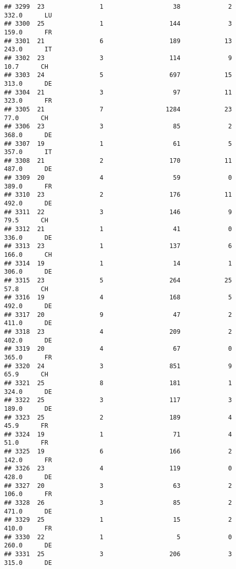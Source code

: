 \documentclass[
]{article}
\begin{document}
\begin{verbatim}
## 3299  23               1                   38             2    332.0      LU
## 3300  25               1                  144             3    159.0      FR
## 3301  21               6                  189            13    243.0      IT
## 3302  23               3                  114             9     10.7      CH
## 3303  24               5                  697            15    313.0      DE
## 3304  21               3                   97            11    323.0      FR
## 3305  21               7                 1284            23     77.0      CH
## 3306  23               3                   85             2    368.0      DE
## 3307  19               1                   61             5    357.0      IT
## 3308  21               2                  170            11    487.0      DE
## 3309  20               4                   59             0    389.0      FR
## 3310  23               2                  176            11    492.0      DE
## 3311  22               3                  146             9     79.5      CH
## 3312  21               1                   41             0    336.0      DE
## 3313  23               1                  137             6    166.0      CH
## 3314  19               1                   14             1    306.0      DE
## 3315  23               5                  264            25     57.8      CH
## 3316  19               4                  168             5    492.0      DE
## 3317  20               9                   47             2    411.0      DE
## 3318  23               4                  209             2    402.0      DE
## 3319  20               4                   67             0    365.0      FR
## 3320  24               3                  851             9     65.9      CH
## 3321  25               8                  181             1    324.0      DE
## 3322  25               3                  117             3    189.0      DE
## 3323  25               2                  189             4     45.9      FR
## 3324  19               1                   71             4     51.0      FR
## 3325  19               6                  166             2    142.0      FR
## 3326  23               4                  119             0    428.0      DE
## 3327  20               3                   63             2    106.0      FR
## 3328  26               3                   85             2    471.0      DE
## 3329  25               1                   15             2    410.0      FR
## 3330  22               1                    5             0    260.0      DE
## 3331  25               3                  206             3    315.0      DE

\end{verbatim}
\end{document}
